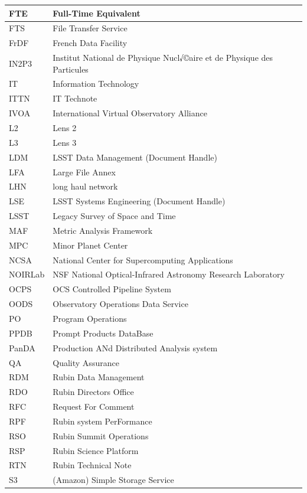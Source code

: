 \begin{longtable}{p{}p{}}
FTE & Full-Time Equivalent \\\hline
FTS & File Transfer Service \\\hline
FrDF & French Data Facility \\\hline
IN2P3 & Institut National de Physique Nucl√©aire et de Physique des Particules \\\hline
IT & Information Technology \\\hline
ITTN & IT Technote \\\hline
IVOA & International Virtual Observatory Alliance \\\hline
L2 & Lens 2 \\\hline
L3 & Lens 3 \\\hline
LDM & LSST Data Management (Document Handle) \\\hline
LFA & Large File Annex \\\hline
LHN & long haul network \\\hline
LSE & LSST Systems Engineering (Document Handle) \\\hline
LSST & Legacy Survey of Space and Time \\\hline
MAF & Metric Analysis Framework \\\hline
MPC & Minor Planet Center \\\hline
NCSA & National Center for Supercomputing Applications \\\hline
NOIRLab & NSF National Optical-Infrared Astronomy Research Laboratory \\\hline
OCPS & OCS Controlled Pipeline System \\\hline
OODS & Observatory Operations Data Service \\\hline
PO & Program Operations \\\hline
PPDB & Prompt Products DataBase \\\hline
PanDA &  Production ANd Distributed Analysis system \\\hline
QA & Quality Assurance \\\hline
RDM & Rubin Data Management \\\hline
RDO & Rubin Directors Office \\\hline
RFC & Request For Comment \\\hline
RPF & Rubin system PerFormance \\\hline
RSO & Rubin Summit Operations \\\hline
RSP & Rubin Science Platform \\\hline
RTN & Rubin Technical Note \\\hline
S3 & (Amazon) Simple Storage Service \\\hline

\end{longtable}
